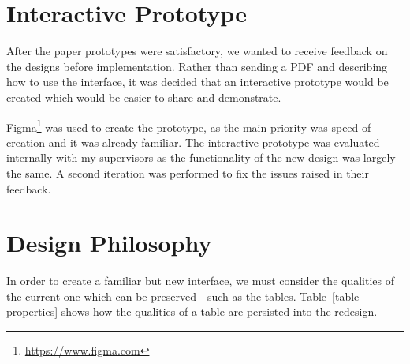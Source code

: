 \documentclass[bsc,frontabs,oneside,singlespacing,parskip,deptreport,logo]{infthesis}
\begin{document}
\section{Interactive Prototype}

After the paper prototypes were satisfactory, we wanted to receive feedback on the designs before implementation. Rather than sending a PDF and describing how to use the interface, it was decided that an interactive prototype would be created which would be easier to share and demonstrate.




Figma\footnote{\url{https://www.figma.com}} was used to create the prototype, as the main priority was speed of creation and it was already familiar. The interactive prototype was evaluated internally with my supervisors as the functionality of the new design was largely the same. A second iteration was performed to fix the issues raised in their feedback.



\section{Design Philosophy}

In order to create a familiar but new interface, we must consider the qualities of the current one which can be preserved---such as the tables. Table~\ref{table-properties} shows how the qualities of a table are persisted into the redesign.
\end{document}
